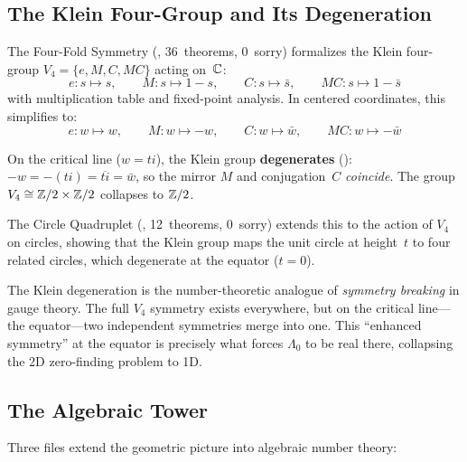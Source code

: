 \subsection{The Klein Four-Group and Its Degeneration}

The Four-Fold Symmetry (, 36~theorems, 0~sorry)
formalizes the Klein four-group $V_4 = \{e, M, C, MC\}$ acting on~$\mathbb{C}$:
\[
  e : s \mapsto s, \qquad
  M : s \mapsto 1-s, \qquad
  C : s \mapsto \bar{s}, \qquad
  MC : s \mapsto 1-\bar{s}
\]
with multiplication table and fixed-point analysis. In centered
coordinates, this simplifies to:
\[
  e : w \mapsto w, \qquad
  M : w \mapsto -w, \qquad
  C : w \mapsto \bar{w}, \qquad
  MC : w \mapsto -\bar{w}
\]

On the critical line ($w = ti$), the Klein group \textbf{degenerates}
(): $-w = -(ti) = \overline{ti} = \bar{w}$,
so the mirror $M$ and conjugation~$C$ \emph{coincide}. The group
$V_4 \cong \mathbb{Z}/2 \times \mathbb{Z}/2$ collapses to $\mathbb{Z}/2$.

The Circle Quadruplet (, 12~theorems, 0~sorry)
extends this to the action of $V_4$ on circles, showing that the
Klein group maps the unit circle at height~$t$ to four related circles,
which degenerate at the equator ($t = 0$).

\begin{remark}
The Klein degeneration is the number-theoretic analogue of
\emph{symmetry breaking} in gauge theory. The full $V_4$ symmetry
exists everywhere, but on the critical line---the equator---two
independent symmetries merge into one. This ``enhanced symmetry'' at
the equator is precisely what forces $\Lambda_0$ to be real there,
collapsing the 2D zero-finding problem to 1D.
\end{remark}

\subsection{The Algebraic Tower}

Three files extend the geometric picture into algebraic number theory:

